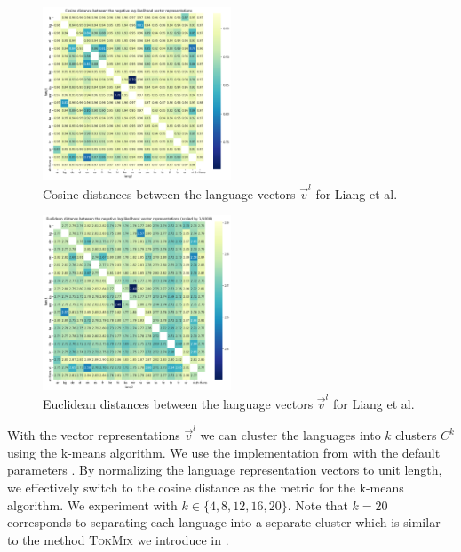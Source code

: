 \begin{figure}[h]
    \centering
    \includegraphics[width=0.5\textwidth]{img/liang_cosine_distances.png}
    \caption{Cosine distances between the language vectors $\vec{v}^l$ for Liang et al.}
    \label{fig:liang_cosine_distances}
\end{figure}

\begin{figure}[h]
    \centering
    \includegraphics[width=0.5\textwidth]{img/liang_euclid_distances.png}
    \caption{Euclidean distances between the language vectors $\vec{v}^l$ for Liang et al.}
    \label{fig:liang_euclid_distances}
\end{figure}


With the vector representations $\vec{v}^l$ we can cluster the languages into $k$ clusters $C^k$ using the k-means algorithm. We use the implementation from \cite{scikit-learn} with the default parameters . By normalizing the language representation vectors to unit length, we effectively switch to the cosine distance as the metric for the k-means algorithm. We experiment with $k \in \{4, 8, 12, 16, 20\}$. Note that $k=20$ corresponds to separating each language into a separate cluster which is similar to the method \textsc{TokMix} we introduce in \citet{limisiewicz_tokenization_2023}. 

